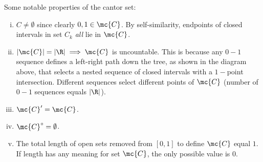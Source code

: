 \smallskip

Some notable properties of the cantor set:
\begin{enumerate}[(i)]
	\item \(C\neq\emptyset\) since clearly \(0,1\in\mc{C}\). By self-similarity, endpoints of closed intervals in set \(C_k\) \emph{all} lie in \(\mc{C}\).
	
	\item  \(|\mc{C}|=|\R|\implies\mc{C}\) is uncountable. This is because any \(0-1\) sequence defines a left-right path down the tree, as shown in the diagram above, that selects a nested sequence of closed intervals with a \(1-\)point intersection. Different sequences select different points of \(\mc{C}\) (number of \(0-1\) sequences equals \(|\R|\)).
	
	\item \(\mc{C}'=\mc{C}\).
	
	\item \(\mc{C}^{\circ}=\emptyset\).
	
	\item The total length of open sets removed from \([0,1]\) to define \(\mc{C}\) equal \(1\). If length has any meaning for set \(\mc{C}\), the only possible value is \(0\).
\end{enumerate}